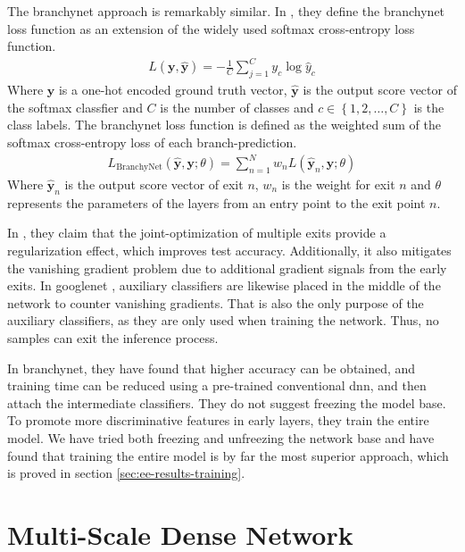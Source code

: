 The \gls{branchynet} approach is remarkably similar. In \cite{teerapittayanon_branchynet:_2016}, they define the \gls{branchynet} loss function as an extension of the widely used softmax cross-entropy loss function.
\begin{align}
L\left(\bm{y},\hat{\bm{y}}\right) = - \frac{1}{C} \sum_{j =1}^{C} y_c \log \hat{y}_c
\end{align}
Where $ \bm{y} $ is a one-hot encoded ground truth vector, $ \bm{\hat{y}} $ is the output score vector of the softmax classfier and $ C $ is the number of classes and $ c \in \left\{1, 2,  \dots, C\right\} $ is the class labels.
The \gls{branchynet} loss function is defined as the weighted sum of the softmax cross-entropy loss of each branch-prediction. 
\begin{align}
L_{\mathrm{BranchyNet}}(\hat{\bm{y}},\bm{y};\theta) = \sum_{n=1}^{N} w_n L \left(\hat{\bm{y}}_{n},\bm{y};\theta\right)
\end{align}
Where $ \bm{\hat{y}}_n $ is the output score vector of exit $ n $, $ w_n $ is the weight for exit $ n $ and $ \theta $ represents the parameters of the layers from an entry point to the exit point $ n $.

In \cite{teerapittayanon_branchynet:_2016}, they claim that the joint-optimization of multiple exits provide a regularization effect, which improves test accuracy. Additionally, it also mitigates the vanishing gradient problem due to additional gradient signals from the early exits.  In \gls{googlenet} \cite{szegedy_going_2015}, auxiliary classifiers are likewise placed in the middle of the network to counter vanishing gradients. That is also the only purpose of the auxiliary classifiers, as they are only used when training the network. Thus, no samples can exit the inference process. 

In \gls{branchynet}, they have found that higher accuracy can be obtained, and training time can be reduced using a pre-trained conventional \gls{dnn}, and then attach the intermediate classifiers. They do not suggest freezing the model base. To promote more discriminative features in early layers, they train the entire model. We have tried both freezing and unfreezing the network base and have found that training the entire model is by far the most superior approach, which is proved in section \ref{sec:ee-results-training}.

\section{Multi-Scale Dense Network} \label{sec:ee-msdnet}

